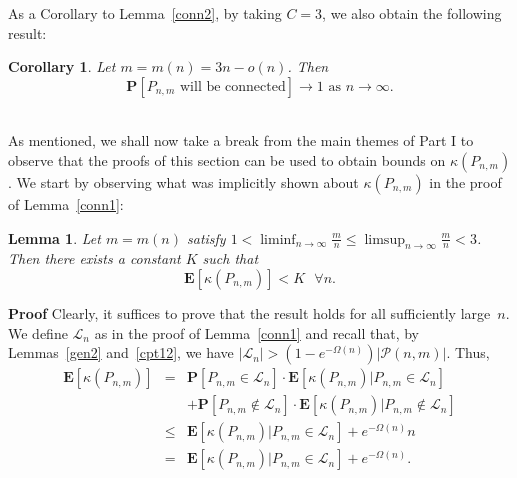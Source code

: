 \documentclass{article}
\newtheorem{Lemma}[Theorem]{Lemma}
\newtheorem{Corollary}[Theorem]{Corollary}
\newtheorem{Proof of Theorem}{Proof of Theorem}
\begin{document}
As a Corollary to Lemma~\ref{conn2}, by taking $C=3$, we also obtain the following result:















\begin{Corollary} \label{conn5}
Let $m=m(n)=3n-o(n)$.
Then
\begin{displaymath}
\mathbf{P}[P_{n,m} \textrm{ will be connected}] \to 1 \textrm{ as } n \to \infty.
\end{displaymath} \\
\end{Corollary}















As mentioned,
we shall now take a break from the main themes of Part I
to observe that the proofs of this section
can be used to obtain bounds on $\kappa(P_{n,m})$.
We start by observing what was implicitly shown about $\kappa (P_{n,m})$ in the proof of Lemma~\ref{conn1}: 















\begin{Lemma} \label{cpt201}
Let $m=m(n)$ satisfy 
$1 < \liminf_{n \to \infty} \frac{m}{n} \leq \limsup_{n \to \infty} \frac{m}{n} < 3$.
Then there exists a constant $K$ such that
\begin{displaymath}
\mathbf{E}[\kappa (P_{n,m})] < K \textrm{ } \forall n.
\end{displaymath}
\end{Lemma}
\textbf{Proof}
Clearly,
it suffices to prove that the result holds for all sufficiently large~$n$.
We define $\mathcal{L}_{n}$ as in the proof of Lemma~\ref{conn1} and recall that,
by Lemmas~\ref{gen2} and~\ref{cpt12},
we have $|\mathcal{L}_{n}| > \left( 1 - e^{- \Omega(n)} \right) |\mathcal{P}(n,m)|$.
Thus,
\begin{eqnarray*}
\mathbf{E}[\kappa (P_{n,m})] 
& = & \mathbf{P}[P_{n,m} \in \mathcal{L}_{n}] \cdot \mathbf{E}[\kappa (P_{n,m}) | P_{n,m} \in \mathcal{L}_{n}] \\
& & + \mathbf{P}[P_{n,m} \notin \mathcal{L}_{n}] \cdot \mathbf{E}[\kappa (P_{n,m}) | P_{n,m} \notin \mathcal{L}_{n}] \\
& \leq & \mathbf{E}[\kappa (P_{n,m}) | P_{n,m} \in \mathcal{L}_{n}]
+ e^{- \Omega(n)} n \\
& = & \mathbf{E}[\kappa (P_{n,m}) | P_{n,m} \in \mathcal{L}_{n}]
+ e^{- \Omega(n)}.
\end{eqnarray*}
\end{document}
